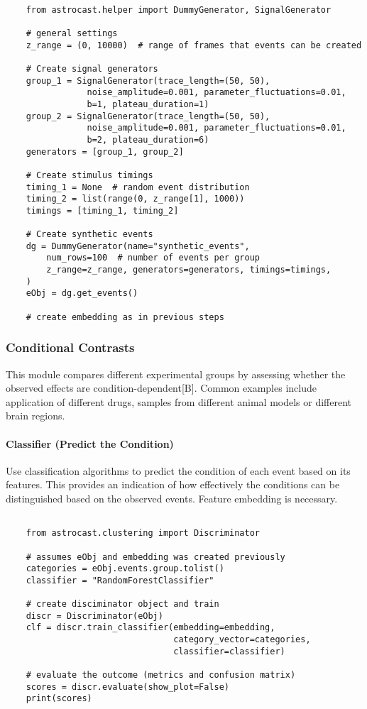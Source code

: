 \begin{lstlisting}[style=pyStyle]

    from astrocast.helper import DummyGenerator, SignalGenerator

    # general settings
    z_range = (0, 10000)  # range of frames that events can be created

    # Create signal generators
    group_1 = SignalGenerator(trace_length=(50, 50),
                noise_amplitude=0.001, parameter_fluctuations=0.01,
                b=1, plateau_duration=1)
    group_2 = SignalGenerator(trace_length=(50, 50),
                noise_amplitude=0.001, parameter_fluctuations=0.01,
                b=2, plateau_duration=6)
    generators = [group_1, group_2]

    # Create stimulus timings
    timing_1 = None  # random event distribution
    timing_2 = list(range(0, z_range[1], 1000))
    timings = [timing_1, timing_2]

    # Create synthetic events
    dg = DummyGenerator(name="synthetic_events",
        num_rows=100  # number of events per group
        z_range=z_range, generators=generators, timings=timings,
    )
    eObj = dg.get_events()

    # create embedding as in previous steps

\end{lstlisting}

\subsubsection{Conditional Contrasts}
This module compares different experimental groups by assessing whether the observed effects are condition-dependent[B]. Common examples include application of different drugs, samples from different animal models or different brain regions.

\paragraph{Classifier (Predict the Condition)}
Use classification algorithms to predict the condition of each event based on its features. This provides an indication of how effectively the conditions can be distinguished based on the observed events. Feature embedding is necessary.

\begin{lstlisting}[style=pyStyle]

    from astrocast.clustering import Discriminator

    # assumes eObj and embedding was created previously
    categories = eObj.events.group.tolist()
    classifier = "RandomForestClassifier"

    # create disciminator object and train
    discr = Discriminator(eObj)
    clf = discr.train_classifier(embedding=embedding,
                                 category_vector=categories,
                                 classifier=classifier)

    # evaluate the outcome (metrics and confusion matrix)
    scores = discr.evaluate(show_plot=False)
    print(scores)

\end{lstlisting}

